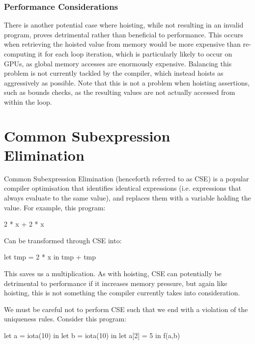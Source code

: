 \subsubsection{Performance Considerations}

There is another potential case where hoisting, while not resulting in
an invalid program, proves detrimental rather than beneficial to
performance.  This occurs when retrieving the hoisted value from
memory would be more expensive than re-computing it for each loop
iteration, which is particularly likely to occur on GPUs, as global
memory accesses are enormously expensive.  Balancing this problem is
not currently tackled by the \LO{} compiler, which instead hoists as
aggressively as possible.  Note that this is not a problem when
hoisting assertions, such as bounds checks, as the resulting values
are not actually accessed from within the loop.

\section{Common Subexpression Elimination}
\label{sec:cse}

Common Subexpression Elimination (henceforth referred to as CSE) is a
popular compiler optimisation that identifies identical expressions
(i.e. expressions that always evaluate to the same value), and
replaces them with a variable holding the value.  For example, this
program:

\begin{colorcode}
2 * x + 2 * x
\end{colorcode}

Can be transformed through CSE into:

\begin{colorcode}
let tmp = 2 * x in
tmp + tmp
\end{colorcode}

This saves us a multiplication.  As with hoisting, CSE can potentially
be detrimental to performance if it increases memory pressure, but
again like hoisting, this is not something the \LO{} compiler
currently takes into consideration.

We must be careful not to perform CSE such that we end with a
violation of the uniqueness rules.  Consider this program:

\begin{colorcode}
let a = iota(10) in
let b = iota(10) in
let a[2] = 5 in
f(a,b)
\end{colorcode}

